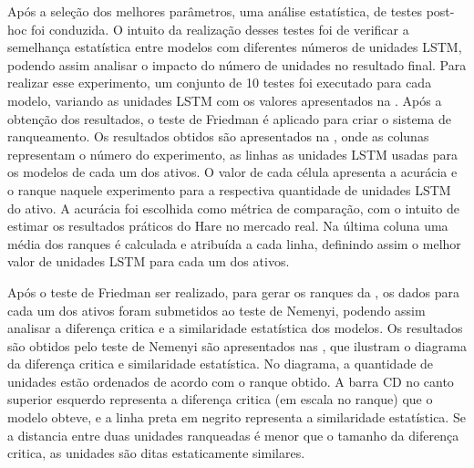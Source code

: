 Após a seleção dos melhores parâmetros, uma análise estatística, de testes post-hoc foi conduzida. O intuito da realização desses testes foi de verificar a semelhança estatística entre modelos com diferentes números de unidades \acrshort{LSTM}, podendo assim analisar o impacto do número de unidades no resultado final. Para realizar esse experimento, um conjunto de 10 testes foi executado para cada modelo, variando as unidades \acrshort{LSTM} com os valores apresentados na . Após a obtenção dos resultados, o teste de Friedman é aplicado para criar o sistema de ranqueamento. Os resultados obtidos são apresentados na , onde as colunas representam o número do experimento, as linhas as unidades \acrshort{LSTM} usadas para os modelos de cada um dos ativos. O valor de cada célula apresenta a acurácia e o ranque naquele experimento para a respectiva quantidade de unidades \acrshort{LSTM} do ativo. A acurácia foi escolhida como métrica de comparação, com o intuito de estimar os resultados práticos do Hare no mercado real. Na última coluna uma média dos ranques é calculada e atribuída a cada linha, definindo assim o melhor valor de unidades \acrshort{LSTM} para cada um dos ativos. 



Após o teste de Friedman ser realizado, para gerar os ranques da , os dados para cada um dos ativos foram submetidos ao teste de Nemenyi, podendo assim analisar a diferença critica e a similaridade estatística dos modelos. Os resultados são obtidos pelo teste de Nemenyi são apresentados nas , que ilustram o diagrama da diferença critica e similaridade estatística. No diagrama, a quantidade de unidades estão ordenados de acordo com o ranque obtido. A barra CD no canto superior esquerdo representa a diferença critica (em escala no ranque) que o modelo obteve, e a linha preta em negrito representa a similaridade estatística. Se a distancia entre duas unidades ranqueadas é menor que o tamanho da diferença critica, as unidades são ditas estaticamente similares.

%

%

%

